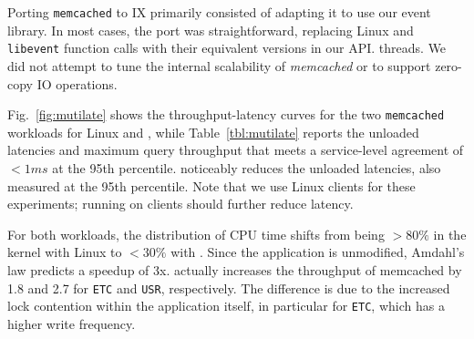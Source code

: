 Porting \texttt{memcached} to IX primarily consisted of adapting it to
use our event library. In most cases, the port was straightforward,
replacing Linux and \texttt{libevent} function calls with their
equivalent versions in our API. %
threads. %
We did not attempt to tune the internal scalability of {\it memcached}
or to support zero-copy IO operations.




Fig.~\ref{fig:mutilate} shows the throughput-latency curves for the
two \texttt{memcached} workloads for Linux and \ix, while
Table~\ref{tbl:mutilate} reports the unloaded latencies and maximum
query throughput that meets a service-level agreement of $<1ms$ at the
95th percentile.  \ix noticeably reduces the unloaded latencies, also
measured at the 95th percentile.  Note that we use Linux clients for
these experiments; running \ix on clients should further reduce
latency.



For both workloads, the distribution of CPU time shifts from being
$>80\%$ in the kernel with Linux to $<30\%$ with \ix.  Since the
application is unmodified, Amdahl's law predicts a speedup of 3x.  \ix
actually increases the throughput of memcached by 1.8 and 2.7 for
\texttt{ETC} and \texttt{USR}, respectively.  The difference is due to
the increased lock contention within the application itself, in
particular for \texttt{ETC}, which has a higher write frequency.


%

